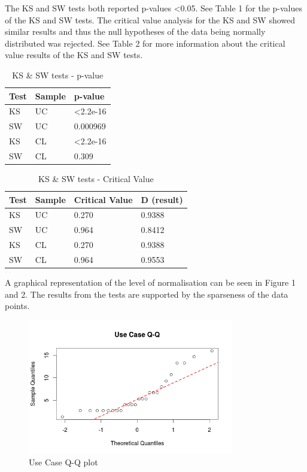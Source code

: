 \documentclass[10pt,twocolumn]{article}
\begin{document}
The KS and SW tests both reported p-values \textless 0.05. See Table 1 for the p-values of the KS and SW tests. The critical value analysis for the KS and SW showed similar results and thus the null hypotheses of the data being normally distributed was rejected. See Table 2 for more information about the critical value results of the KS and SW tests.


\begin{table}
	\centering
	\begin{tabular}[ht]{| l | l | l |}
	\hline
	Test & Sample & p-value  \\
	\hline
	KS & UC & \textless 2.2e-16 \\
	\hline
	SW & UC & 0.000969 \\
	\hline
	KS & CL & \textless 2.2e-16 \\
	\hline
	SW & CL & 0.309 \\	
	\hline
	\end{tabular}
	\caption{KS \& SW tests - p-value}
\end{table}


\begin{table}
	\centering
	\begin{tabular}[ht]{| l | l | l | l |}
	\hline
	Test & Sample & Critical Value & D (result)  \\
	\hline
	KS & UC & 0.270 & 0.9388 \\
	\hline
	SW & UC & 0.964 &  0.8412 \\
	\hline
	KS & CL & 0.270 & 0.9388 \\
	\hline
	SW & CL & 0.964 & 0.9553 \\	
	\hline
	\end{tabular}
	\caption{KS \& SW tests - Critical Value}
\end{table}


A graphical representation of the level of normalisation can be seen in Figure 1 and 2. The results from the tests are supported by the sparseness of the data points. 

\begin{figure}[ht]
\centering
\includegraphics[width=90mm]{uc_qq.png}
\caption{Use Case Q-Q plot}
\end{figure}
\end{document}
